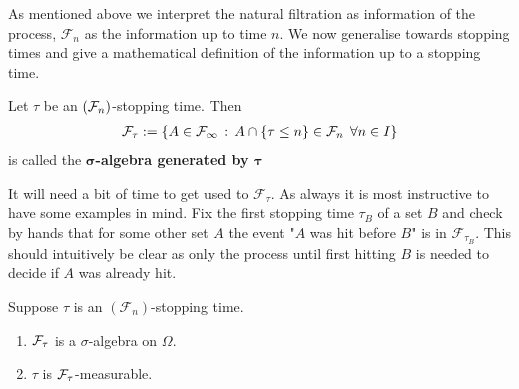 




As mentioned above we interpret the natural filtration as information of the process, $\mathcal F_n$ as the information up to time $n$. We now generalise towards stopping times and give a mathematical definition of the information up to a stopping time.
\begin{ldef}
\begin{deff}
	Let $\tau$ be an $(\mathcal{F}_n)$-stopping time. Then
	\begin{align*}
		\mathcal{F}_{\tau}:= \lbrace A\in \mathcal{F}_{\infty}\, :\, A \cap \lbrace \tau \leq n \rbrace \in \mathcal{F}_n \:\: \forall n \in I \rbrace
	\end{align*}
	is called the $\mathbf{\sigma}$\textbf{-algebra generated by $\mathbf{\tau}$}
\end{deff}
\end{ldef}
It will need a bit of time to get used to $\mathcal F_\tau$. As always it is most instructive to have some examples in mind. Fix the first stopping time $\tau_B$ of a set $B$ and check by hands that for some other set $A$ the event "{}$A$ was hit before $B$"{} is in $\mathcal F_{\tau_{B}}$. This should intuitively be clear as only the process until first hitting $B$ is needed to decide if $A$ was already hit. 
\begin{llemma}
\begin{prop}\label{ii}
	Suppose $\tau$ is an $(\mathcal F_n)$-stopping time. 
	\begin{enumerate}[label=(\roman*)]
		\item 	$\mathcal{F}_{\tau}$ is a $\sigma$-algebra on $\Omega$.
		\item	 	$\tau$ is $\mathcal{F}_{\tau}$-measurable.
	\end{enumerate}
\end{prop}
\end{llemma}
